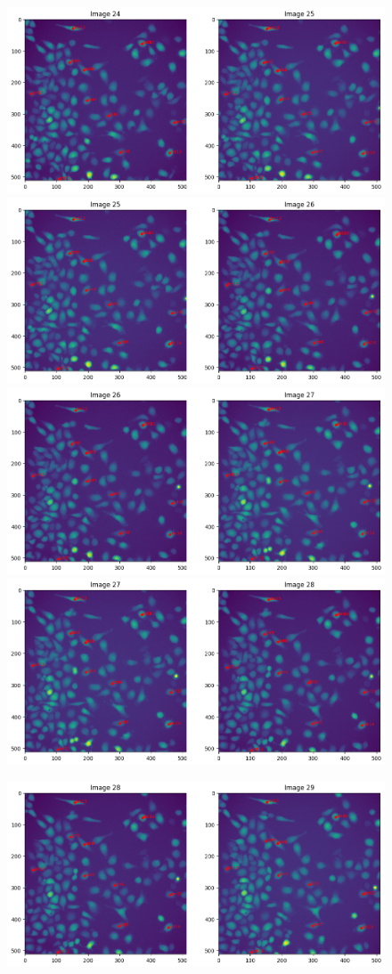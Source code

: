 \documentclass{article}
\begin{document}
\begin{figure}[h!]
\centering
\includegraphics[width=0.75\linewidth]{Report/RImages/Traces_Control/image_25a.png}
\includegraphics[width=0.75\linewidth]
{Report/RImages/Traces_Control/image_26a.png}
\includegraphics[width=0.75\linewidth]
{Report/RImages/Traces_Control/image_27a.png}
\includegraphics[width=0.75\linewidth]{Report/RImages/Traces_Control/image_28a.png}
\end{figure}


\begin{figure}[h!]
\centering
\includegraphics[width=0.75\linewidth]{Report/RImages/Traces_Control/image_29a.png}
\end{figure}
\end{document}
